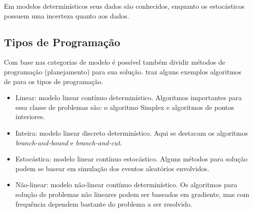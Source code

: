 Em modelos determinísticos seus dados são conhecidos, enquanto os estocásticos possuem uma
incerteza quanto aos dados.

\subsection{Tipos de Programação}\label{subsec:tipos-de-programacao}

Com base nas categorias de modelo é possível também dividir métodos de programação (planejamento)
para sua solução.
\citeauthor*{hillier1967introduction} traz alguns exemplos algoritmos de para os tipos de programação.

\begin{itemize}
    \item Linear: modelo linear contínuo determinístico.
    Algoritmos importantes para essa classe de problemas são: o algoritmo Simplex
    e algoritmos de pontos interiores.
    \item Inteira: modelo linear discreto determinístico.
    Aqui se destacam os algoritmos \textit{branch-and-bound} e \textit{branch-and-cut}.
    \item Estocástica: modelo linear contínuo estocástico.
    Alguns métodos para solução podem se basear em simulação dos eventos aleatórios envolvidos.
    \item Não-linear: modelo não-linear contínuo determinístico.
    Os algoritmos para solução de problemas não lineares podem ser baseados em gradiente,
    mas com frequência dependem bastante do problema a ser resolvido.
\end{itemize}
